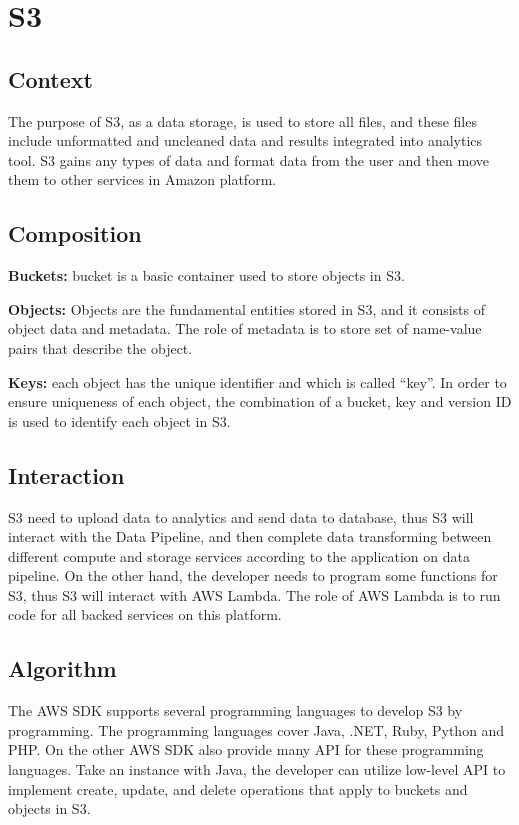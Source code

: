 \section{S3}
	\subsection{Context}
	The purpose of S3, as a data storage, is used to store all files, and these files include unformatted and uncleaned data and results integrated into analytics tool. S3 gains any types of data and format data from the user and then move them to other services in Amazon platform.
        
	\subsection{Composition}
	\textbf{Buckets:} bucket is a basic container used to store objects in S3.\cite{z1}
     
    \noindent \textbf{Objects:} Objects are the fundamental entities stored in S3, and it consists of object data and metadata. The role of metadata is to store set of name-value pairs that describe the object.\cite{z1}
        
	\noindent \textbf{Keys:} each object has the unique identifier and which is called “key”. In order to ensure uniqueness of each object, the combination of a bucket, key and version ID is used to identify each object in S3.\cite{z1}
    
	\subsection{Interaction}
    S3 need to upload data to analytics and send data to database, thus S3 will interact with the Data Pipeline, and then complete data transforming between different compute and storage services according to the application on data pipeline. On the other hand, the developer needs to program some functions for S3, thus S3 will interact with AWS Lambda. The role of AWS Lambda is to run code for all backed services on this platform.
    
	\subsection{Algorithm}
    The AWS SDK supports several programming languages to develop S3 by programming. The programming languages cover Java, .NET, Ruby, Python and PHP. On the other AWS SDK also provide many API for these programming languages. Take an instance with Java, the developer can utilize low-level API to implement create, update, and delete operations that apply to buckets and objects in S3.\cite{z2} 
   
